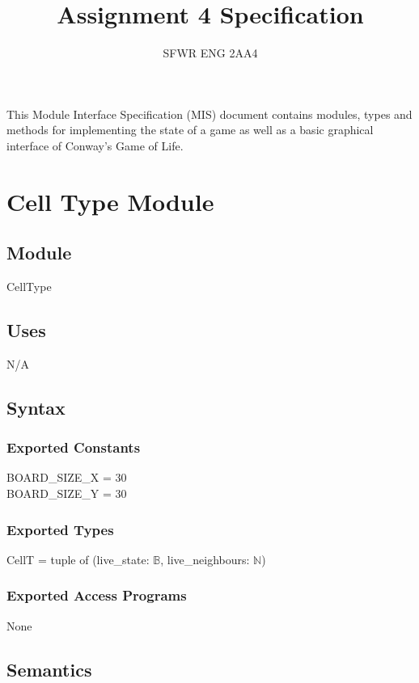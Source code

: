 \documentclass[12pt]{article}
\title{Assignment 4 Specification}
\author{SFWR ENG 2AA4}
\begin{document}
\maketitle
This Module Interface Specification (MIS) document contains modules, types and
methods for implementing the state of a game as well as a basic graphical interface of Conway's Game of Life.






\newpage

\section* {Cell Type Module}

\subsection*{Module}

CellType

\subsection* {Uses}

N/A

\subsection* {Syntax}

\subsubsection* {Exported Constants}

BOARD\_SIZE\_X = 30\\
BOARD\_SIZE\_Y = 30

\subsubsection* {Exported Types}

CellT = tuple of (live\_state: $\mathbb{B}$, live\_neighbours: $\mathbb{N}$)

\subsubsection* {Exported Access Programs}

None

\subsection* {Semantics}
\end{document}

